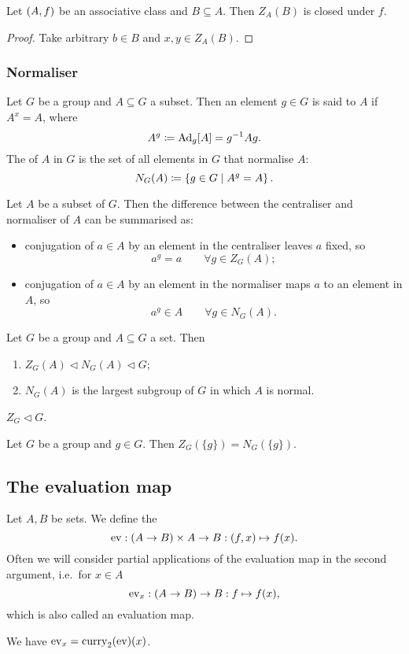 \begin{proposition}
Let $\left( A,f \right)$ be an associative class and $B\subseteq A$. Then $Z_A(B)$ is closed under $f$.
\end{proposition}
\begin{proof}
Take arbitrary $b\in B$ and $x,y\in Z_A(B)$.
\end{proof}

\subsubsection{Normaliser}
\begin{definition}
Let $G$ be a group and $A\subseteq G$ a subset. Then an element $g\in G$ is said to  $A$ if $A^x = A$, where
\[ A^g \coloneqq \operatorname{Ad}_g[A] = g^{-1}Ag. \]
The  of $A$ in $G$ is the set of all elements in $G$ that normalise $A$:
\[ N_G(A) \coloneqq \left\{ g\in G \;\middle|\; A^g = A \right\}. \]
\end{definition}
Let $A$ be a subset of $G$. Then the difference between the centraliser and normaliser of $A$ can be summarised as:
\begin{itemize}
\item conjugation of $a\in A$ by an element in the centraliser leaves $a$ fixed, so
\[ a^g = a \qquad \forall g\in Z_G(A); \]
\item conjugation of $a\in A$ by an element in the normaliser maps $a$ to an element in $A$, so
\[ a^g \in A \qquad \forall g\in N_G(A). \]
\end{itemize}
\begin{lemma}
Let $G$ be a group and $A\subseteq G$ a set. Then
\begin{enumerate}
\item $Z_G(A) \lhd N_G(A) \lhd G$;
\item $N_G(A)$ is the largest subgroup of $G$ in which $A$ is normal.
\end{enumerate}
\end{lemma}
\begin{corollary}
$Z_G\lhd G$.
\end{corollary}

\begin{lemma}
Let $G$ be a group and $g\in G$. Then $Z_G(\{g\}) = N_G(\{g\})$.
\end{lemma}


\subsection{The evaluation map}
\begin{definition}
Let $A,B$ be sets. We define the 
\[ \operatorname{ev}: (A\to B)\times A \to B: (f,x) \mapsto f(x). \]
Often we will consider partial applications of the evaluation map in the second argument, i.e.\ for $x\in A$
\[ \operatorname{ev}_x: (A\to B) \to B: f\mapsto f(x), \]
which is also called an evaluation map.
\end{definition}
We have $\operatorname{ev}_x = \operatorname{curry}_2(\operatorname{ev})(x)$.



